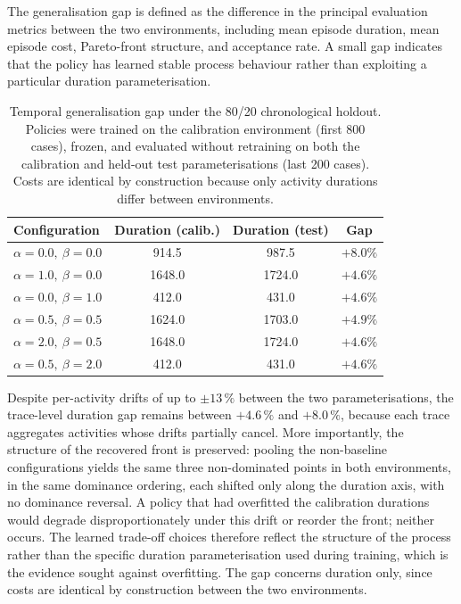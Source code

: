 The generalisation gap is defined as the difference in the principal
evaluation metrics between the two environments, including mean
episode duration, mean episode cost, Pareto-front structure, and
acceptance rate. A small gap indicates that the policy has learned
stable process behaviour rather than exploiting a particular duration
parameterisation.

\begin{table}[H]
\centering
\caption{Temporal generalisation gap under the 80/20 chronological holdout. Policies were trained on the calibration environment (first 800 cases), frozen, and evaluated without retraining on both the calibration and held-out test parameterisations (last 200 cases). Costs are identical by construction because only activity durations differ between environments.}
\label{tab}
\begin{tabular}{lccc}
\toprule
\textbf{Configuration} &
\textbf{Duration (calib.)} &
\textbf{Duration (test)} &
\textbf{Gap} \\
\midrule
$\alpha=0.0,\ \beta=0.0$ & 914.5 & 987.5 & $+8.0\%$ \\
$\alpha=1.0,\ \beta=0.0$ & 1648.0 & 1724.0 & $+4.6\%$ \\
$\alpha=0.0,\ \beta=1.0$ & 412.0 & 431.0 & $+4.6\%$ \\
$\alpha=0.5,\ \beta=0.5$ & 1624.0 & 1703.0 & $+4.9\%$ \\
$\alpha=2.0,\ \beta=0.5$ & 1648.0 & 1724.0 & $+4.6\%$ \\
$\alpha=0.5,\ \beta=2.0$ & 412.0 & 431.0 & $+4.6\%$ \\
\bottomrule
\end{tabular}
\end{table}
Despite per-activity drifts of up to $\pm 13\,\%$ between the two
parameterisations, the trace-level duration gap remains between
$+4.6\,\%$ and $+8.0\,\%$, because each trace aggregates activities
whose drifts partially cancel. More importantly, the structure of the
recovered front is preserved: pooling the non-baseline configurations
yields the same three non-dominated points in both environments, in the
same dominance ordering, each shifted only along the duration axis, with
no dominance reversal. A policy that had overfitted the calibration
durations would degrade disproportionately under this drift or reorder
the front; neither occurs. The learned trade-off choices therefore
reflect the structure of the process rather than the specific duration
parameterisation used during training, which is the evidence sought
against overfitting. The gap concerns duration only, since costs are
identical by construction between the two environments.

